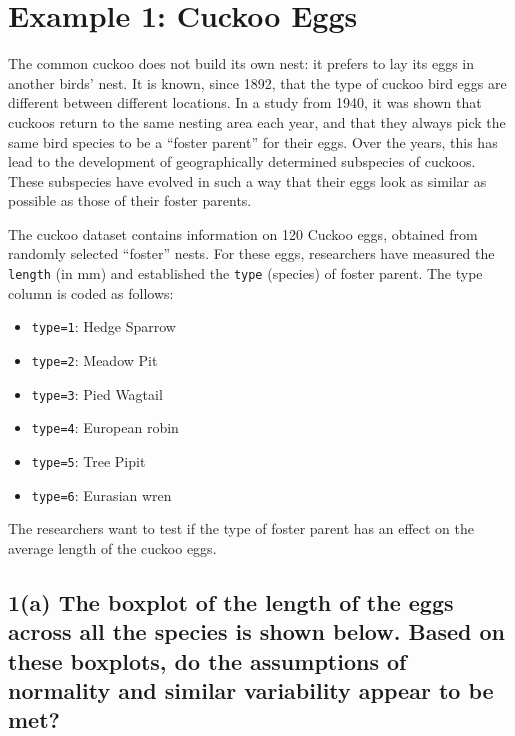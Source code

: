 \documentclass[
]{book}
\providecommand{\tightlist}{%
  \setlength{\itemsep}{0pt}\setlength{\parskip}{0pt}}
\begin{document}
\hypertarget{example-1-cuckoo-eggs}{%
\section{Example 1: Cuckoo Eggs}\label{example-1-cuckoo-eggs}}

The common cuckoo does not build its own nest: it prefers to lay its eggs in another birds' nest. It is known, since 1892, that the type of cuckoo bird eggs are different between different locations. In a study from 1940, it was shown that cuckoos return to the same nesting area each year, and that they always pick the same bird species to be a ``foster parent'' for their eggs. Over the years, this has lead to the development of geographically determined subspecies of cuckoos. These subspecies have evolved in such a way that their eggs look as similar as possible as those of their foster parents.

The cuckoo dataset contains information on 120 Cuckoo eggs, obtained from randomly selected ``foster'' nests. For these eggs, researchers have measured the \texttt{length} (in mm) and established the \texttt{type} (species) of foster parent. The type column is coded as follows:

\begin{itemize}
\tightlist
\item
  \texttt{type=1}: Hedge Sparrow
\item
  \texttt{type=2}: Meadow Pit
\item
  \texttt{type=3}: Pied Wagtail
\item
  \texttt{type=4}: European robin
\item
  \texttt{type=5}: Tree Pipit
\item
  \texttt{type=6}: Eurasian wren
\end{itemize}

The researchers want to test if the type of foster parent has an effect on the average length of the cuckoo eggs.

\hypertarget{a-the-boxplot-of-the-length-of-the-eggs-across-all-the-species-is-shown-below.-based-on-these-boxplots-do-the-assumptions-of-normality-and-similar-variability-appear-to-be-met}{%
\subsection{1(a) The boxplot of the length of the eggs across all the species is shown below. Based on these boxplots, do the assumptions of normality and similar variability appear to be met?}\label{a-the-boxplot-of-the-length-of-the-eggs-across-all-the-species-is-shown-below.-based-on-these-boxplots-do-the-assumptions-of-normality-and-similar-variability-appear-to-be-met}}
\end{document}
